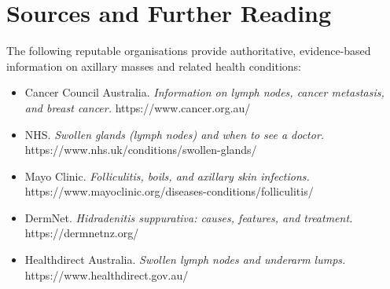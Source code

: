 \section*{Sources and Further Reading}
The following reputable organisations provide authoritative, evidence-based information on axillary masses and related health conditions:
\begin{itemize}
    \item Cancer Council Australia. \textit{Information on lymph nodes, cancer metastasis, and breast cancer.} https://www.cancer.org.au/
    \item NHS. \textit{Swollen glands (lymph nodes) and when to see a doctor.} https://www.nhs.uk/conditions/swollen-glands/
    \item Mayo Clinic. \textit{Folliculitis, boils, and axillary skin infections.} https://www.mayoclinic.org/diseases-conditions/folliculitis/
    \item DermNet. \textit{Hidradenitis suppurativa: causes, features, and treatment.} https://dermnetnz.org/
    \item Healthdirect Australia. \textit{Swollen lymph nodes and underarm lumps.} https://www.healthdirect.gov.au/
\end{itemize}
